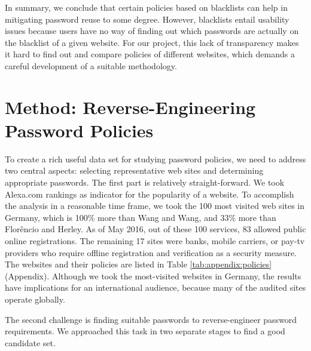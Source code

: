 In summary, we conclude that certain policies based on blacklists can help in mitigating password reuse to some degree. However, blacklists entail usability issues because users have no way of finding out which passwords are actually on the blacklist of a given website. For our project, this lack of transparency makes it hard to find out and compare policies of different websites, which demands a careful development of a suitable methodology.

\section{Method: Reverse-Engineering Password Policies}
To create a rich useful data set for studying password policies, we need to address two central aspects: selecting representative web sites and determining appropriate passwords. The first part is relatively straight-forward. We took Alexa.com rankings as indicator for the popularity of a website. To accomplish the analysis in a reasonable time frame, we took the 100 most visited web sites in Germany, which is 100\% more than Wang and Wang, and 33\% more than Florêncio and Herley. As of May 2016, out of these 100 services, 83 allowed public online registrations. The remaining 17 sites were banks, mobile carriers, or pay-tv providers who require offline registration and verification as a security measure. The websites and their policies are listed in Table \ref{tab:appendix:policies} (Appendix). Although we took the most-visited websites in Germany, the results have implications for an international audience, because many of the audited sites operate globally.

The second challenge is finding suitable passwords to reverse-engineer password requirements. We approached this task in two separate stages to find a good candidate set. 

